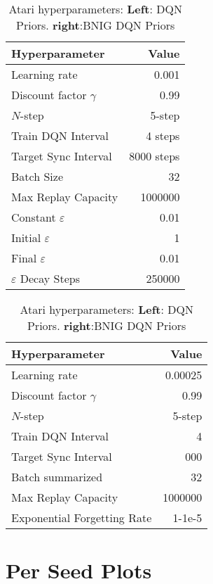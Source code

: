 {{\begin{table}[H]
    \centering
    \begin{tabular}{@{}lr@{}}
        \toprule
        Hyperparameter               & Value \\ \midrule
        Learning rate                & 0.001 \\
        Discount factor $\gamma$     & 0.99  \\
        $N$-step                     & 5-step \\
        Train DQN Interval           & 4 steps \\
        Target Sync Interval         & 8000 steps \\
        Batch Size                   & 32 \\
        Max Replay Capacity          & 1000000 \\ 
        Constant $\varepsilon$       & 0.01 \\ 
        Initial $\varepsilon$        & 1 \\
        Final $\varepsilon$          & 0.01 \\
        $\varepsilon$ Decay Steps    & 250000 \\ \bottomrule
    \end{tabular}
    \quad
    \begin{tabular}{@{}lr@{}}
        \toprule
        Hyperparameter               & Value \\ \midrule
        Learning rate                & 0.00025 \\
        Discount factor $\gamma$     & 0.99  \\
        $N$-step                     & 5-step \\
        Train DQN Interval           & 4 \\
        Target Sync Interval         & 000 \\
        Batch summarized             & 32 \\
        Max Replay Capacity          & 1000000 \\
        Exponential Forgetting Rate  & 1-1e-5 \\ \bottomrule
    \end{tabular}
    \caption{Atari hyperparameters: \textbf{Left}: DQN Priors. \textbf{right}:BNIG DQN Priors}
\end{table}

\clearpage

\section{Per Seed Plots}


}}

